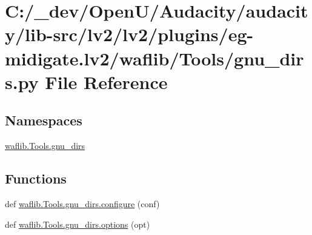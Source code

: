 \hypertarget{lv2_2plugins_2eg-midigate_8lv2_2waflib_2_tools_2gnu__dirs_8py}{}\section{C\+:/\+\_\+dev/\+Open\+U/\+Audacity/audacity/lib-\/src/lv2/lv2/plugins/eg-\/midigate.lv2/waflib/\+Tools/gnu\+\_\+dirs.py File Reference}
\label{lv2_2plugins_2eg-midigate_8lv2_2waflib_2_tools_2gnu__dirs_8py}
\subsection*{Namespaces}
\begin{DoxyCompactItemize}
\item 
 \hyperlink{namespacewaflib_1_1_tools_1_1gnu__dirs}{waflib.\+Tools.\+gnu\+\_\+dirs}
\end{DoxyCompactItemize}
\subsection*{Functions}
\begin{DoxyCompactItemize}
\item 
def \hyperlink{namespacewaflib_1_1_tools_1_1gnu__dirs_a03d9dce5a06f4f739652667447f57eb9}{waflib.\+Tools.\+gnu\+\_\+dirs.\+configure} (conf)
\item 
def \hyperlink{namespacewaflib_1_1_tools_1_1gnu__dirs_ad291b2ee61d479ae1005acd11eaf6ead}{waflib.\+Tools.\+gnu\+\_\+dirs.\+options} (opt)
\end{DoxyCompactItemize}

